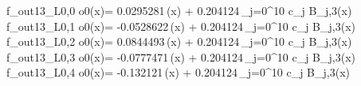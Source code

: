 f_{out13_L0,0	o0}(x)= 0.0295281\,\phi(x) + 0.204124\,\sum_{j=0}^{10} c_j B_{j,3}(x)
f_{out13_L0,1	o0}(x)= -0.0528622\,\phi(x) + 0.204124\,\sum_{j=0}^{10} c_j B_{j,3}(x)
f_{out13_L0,2	o0}(x)= 0.0844493\,\phi(x) + 0.204124\,\sum_{j=0}^{10} c_j B_{j,3}(x)
f_{out13_L0,3	o0}(x)= -0.0777471\,\phi(x) + 0.204124\,\sum_{j=0}^{10} c_j B_{j,3}(x)
f_{out13_L0,4	o0}(x)= -0.132121\,\phi(x) + 0.204124\,\sum_{j=0}^{10} c_j B_{j,3}(x)
